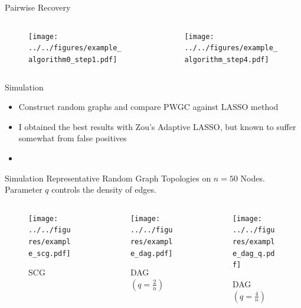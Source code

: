 \documentclass{beamer} %
\begin{document}
\begin{frame}{Pairwise Recovery}
  \begin{columns}
    \begin{column}{0.5\linewidth}
      \begin{figure}
        \texttt{[image: ../../figures/example\_algorithm0\_step1.pdf]}
      \end{figure}
    \end{column}

    \begin{column}{0.5\linewidth}
      \begin{figure}
        \texttt{[image: ../../figures/example\_algorithm\_step4.pdf]}
      \end{figure}
    \end{column}
  \end{columns}
\end{frame}


\begin{frame}{Simulation}
  \begin{itemize}
    \item{Construct random graphs and compare PWGC against LASSO method}\pause
    \item{I obtained the best results with Zou's Adaptive LASSO, but known to suffer somewhat from false positives}
    \item{}
  \end{itemize}
\end{frame}

\begin{frame}{Simulation}
  Representative Random Graph Topologies on $n = 50$ Nodes.  Parameter
  $q$ controls the density of edges.
  \begin{columns}
    \begin{column}{0.33\linewidth}
      \begin{figure}
        \caption{SCG}
        \texttt{[image: ../../figures/example\_scg.pdf]}
      \end{figure}
    \end{column}\pause
    \begin{column}{0.33\linewidth}
      \begin{figure}
        \caption{DAG $(q = \frac{2}{n})$}
        \texttt{[image: ../../figures/example\_dag.pdf]}
      \end{figure}
    \end{column}\pause
    \begin{column}{0.33\linewidth}
      \begin{figure}
        \caption{DAG $(q = \frac{4}{n})$}
        \texttt{[image: ../../figures/example\_dag\_q.pdf]}
      \end{figure}
    \end{column}\pause
  \end{columns}
\end{frame}
\end{document}
